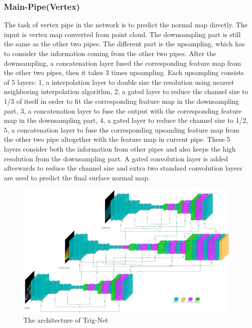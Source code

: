 \subsubsection{Main-Pipe(Vertex)}
The task of vertex pipe in the network is to predict the normal map directly. The input is vertex map converted from point cloud. The downsampling part is still the same as the other two pipes. The different part is the upsampling, which has to consider the information coming from the other two pipes. After the downsampling, a concatenation layer fused the corresponding feature map from the other two pipes, then it takes 3 times upsampling. Each upsampling consists of 5 layers: 1, a interpolation layer to double size the resolution using nearest neighboring interpolation algorithm, 2, a gated layer to reduce the channel size to 1/3 of itself in order to fit the corresponding feature map in the downsampling part, 3, a concatenation layer to fuse the output with the corresponding feature map in the downsampling part, 4, a gated layer to reduce the channel size to 1/2, 5, a concatenation layer to fuse the corresponding upsamling feature map from the other two pipe altogether with the feature map in current pipe. These 5 layers consider both the information from other pipes and also keeps the high resolution from the downsampling part. A gated convolution layer is added afterwards to reduce the channel size and extra two standard convolution layers are used to predict the final surface normal map.


\begin{figure}
	\centering
	\includegraphics[width=1\textwidth]{Figures/trignet} %
	\decoRule
	\caption{The architecture of Trig-Net}
	\label{fig:Trig-Net}
\end{figure}






